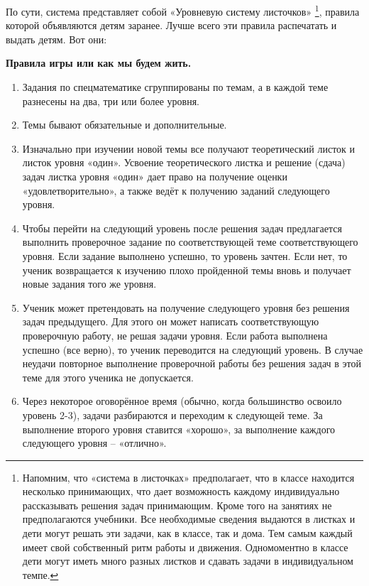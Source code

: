 	По сути, система представляет собой «Уровневую систему листочков» \footnote{ Напомним, что «система в листочках» предполагает, что в классе находится несколько принимающих, что дает возможность каждому индивидуально рассказывать решения задач принимающим. Кроме того на занятиях не предполагаются учебники. Все необходимые сведения выдаются в листках и дети могут решать эти задачи, как в классе, так и дома. Тем самым каждый имеет свой собственный ритм работы и движения. Одномоментно в классе дети могут иметь много разных листков и сдавать задачи в индивидуальном темпе.}, правила которой объявляются детям заранее.	Лучше всего эти правила распечатать и выдать детям. Вот они:
	\begin{center}
		\textbf{Правила игры или как мы будем жить.}
	\end{center}
\begin{enumerate}
	\item Задания по спецматематике сгруппированы по темам, а в каждой теме разнесены на два, три или более уровня.
	\item Темы бывают обязательные и дополнительные. 
	\item Изначально при изучении новой темы все получают теоретический листок и листок уровня «один». Усвоение теоретического листка и решение (сдача) задач листка уровня «один» дает право на получение оценки «удовлетворительно», а также ведёт к  получению заданий следующего уровня.
	\item Чтобы перейти на следующий уровень после решения задач предлагается выполнить проверочное задание по соответствующей теме соответствующего уровня. Если задание выполнено успешно, то уровень зачтен. Если нет, то ученик возвращается к изучению плохо пройденной темы вновь и получает новые задания того же уровня.
	\item Ученик может претендовать на получение следующего уровня без решения задач предыдущего. Для этого он может написать соответствующую проверочную работу, не решая задачи уровня. Если работа выполнена успешно (все верно), то ученик переводится на следующий уровень. В случае неудачи повторное выполнение проверочной работы без решения задач в этой теме для этого ученика не допускается.
	\item Через некоторое оговорённое время (обычно, когда большинство освоило уровень 2-3), задачи разбираются и переходим к следующей теме. За выполнение второго уровня ставится «хорошо», за выполнение каждого следующего уровня – «отлично».
	\end{enumerate}

